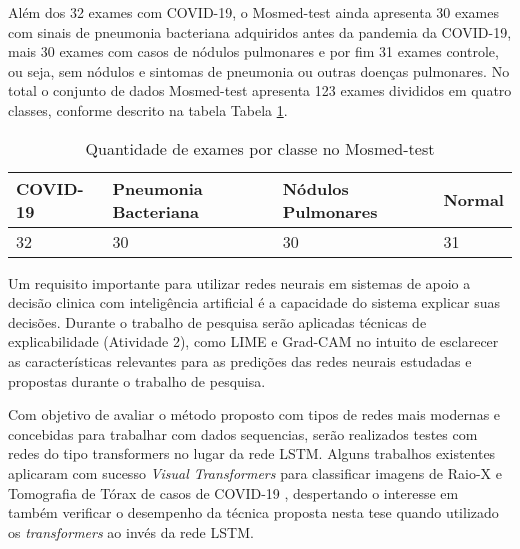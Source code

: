 Além dos 32 exames com COVID-19, o Mosmed-test ainda apresenta 30 exames com sinais de pneumonia bacteriana adquiridos antes da pandemia da COVID-19, mais 30 exames com casos de nódulos pulmonares e por fim 31 exames controle, ou seja, sem nódulos e sintomas de pneumonia ou outras doenças pulmonares. No total o conjunto de dados Mosmed-test apresenta 123 exames divididos em quatro classes, conforme descrito na tabela Tabela \ref{table:composicao_mosmed_test}.

\begin{table}[]
\centering
\caption{Quantidade de exames por classe no Mosmed-test}
\label{table:composicao_mosmed_test}
\begin{tabular}{@{}llll@{}}
\toprule
COVID-19 & Pneumonia Bacteriana & Nódulos Pulmonares & Normal \\ \midrule
32       & 30                   & 30                 & 31     \\ \bottomrule
\end{tabular}
\end{table}


Um requisito importante para utilizar redes neurais em sistemas de apoio a decisão clinica com inteligência artificial é a capacidade do sistema explicar suas decisões. Durante o trabalho de pesquisa serão aplicadas técnicas de explicabilidade (Atividade 2), como LIME \cite{ribeiro2016should} e Grad-CAM \cite{selvaraju2017grad} no intuito de esclarecer as características relevantes para as predições das redes neurais estudadas e propostas durante o trabalho de pesquisa.

Com objetivo de avaliar o método proposto com tipos de redes mais modernas e concebidas para trabalhar com dados sequencias, serão realizados testes com redes do tipo transformers no lugar da rede LSTM. Alguns trabalhos existentes aplicaram com sucesso \textit{Visual Transformers} \cite{dosovitskiy2020image} para classificar imagens de Raio-X e Tomografia de Tórax de casos de COVID-19 \cite{shamshad2022transformers}, despertando o interesse em também verificar o desempenho da técnica proposta nesta tese quando utilizado os \textit{transformers} ao invés da rede LSTM.

